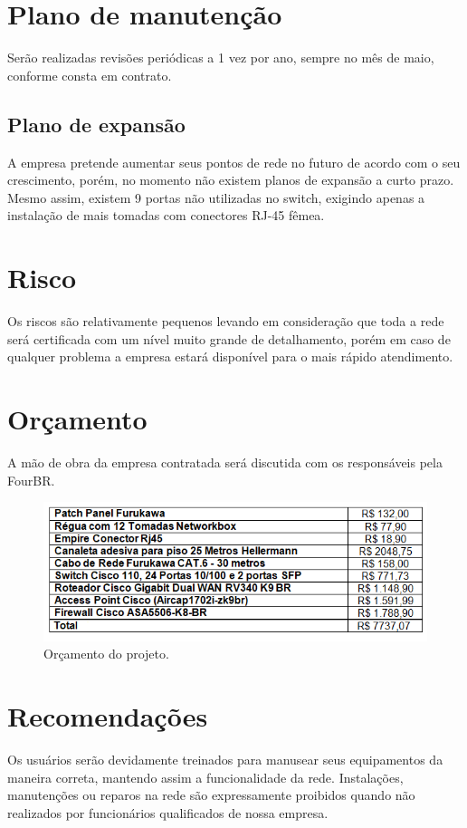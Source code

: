 \documentclass[	DIV=calc,%
							paper=a4,%
							fontsize=12pt,%
							onecolumn]{scrartcl}	 					%
\begin{document}
\section{Plano de manutenção}

Serão realizadas revisões periódicas a 1 vez por ano, sempre no mês de maio, conforme consta em contrato. 

\subsection{Plano de expansão}
A empresa pretende aumentar seus pontos de rede no futuro de acordo com o seu crescimento, porém, no momento não existem planos de expansão a curto prazo. Mesmo assim, existem 9 portas não utilizadas no switch, exigindo apenas a instalação de mais tomadas com conectores RJ-45 fêmea.  

\section{Risco}
Os riscos são relativamente pequenos levando em consideração que toda a rede será certificada com um nível muito grande de detalhamento, porém em caso de qualquer problema a empresa estará disponível para o mais rápido atendimento. 

\section{Orçamento}
A mão de obra da empresa contratada será discutida com os responsáveis pela FourBR.
\begin{figure}[h]
	\centering
	\includegraphics[scale=0.6]{orac}
	\caption{Orçamento do projeto.}
	\label{orac}
\end{figure} 

\section{Recomendações}
Os usuários serão devidamente treinados para manusear seus equipamentos da maneira correta, mantendo assim a funcionalidade da rede. Instalações, manutenções ou reparos na rede são expressamente proibidos quando não realizados por funcionários qualificados de nossa empresa.
\end{document}
